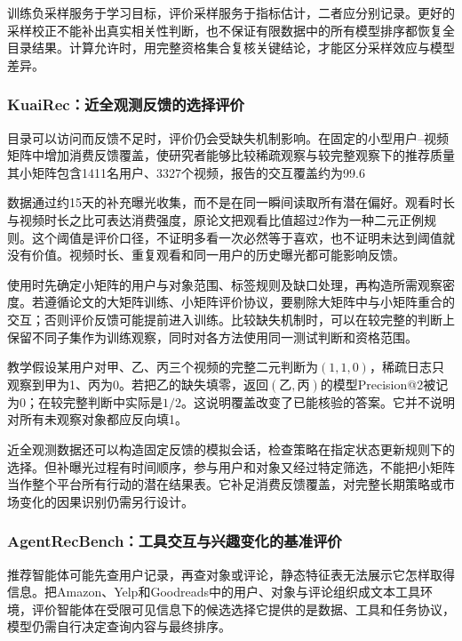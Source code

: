 训练负采样服务于学习目标，评价采样服务于指标估计，二者应分别记录。更好的采样校正不能补出真实相关性判断，也不保证有限数据中的所有模型排序都恢复全目录结果。计算允许时，用完整资格集合复核关键结论，才能区分采样效应与模型差异。

\Needspace{95mm}
\subsubsection{KuaiRec：近全观测反馈的选择评价}
\label{sec:rs-evaluation-kuairec}

目录可以访问而反馈不足时，评价仍会受缺失机制影响。在固定的小型用户--视频矩阵中增加消费反馈覆盖，使研究者能够比较稀疏观察与较完整观察下的推荐质量其小矩阵包含1411名用户、3327个视频，报告的交互覆盖约为99.6%

数据通过约15天的补充曝光收集，而不是在同一瞬间读取所有潜在偏好。观看时长与视频时长之比可表达消费强度，原论文把观看比值超过2作为一种二元正例规则。这个阈值是评价口径，不证明多看一次必然等于喜欢，也不证明未达到阈值就没有价值。视频时长、重复观看和同一用户的历史曝光都可能影响反馈。

使用时先确定小矩阵的用户与对象范围、标签规则及缺口处理，再构造所需观察密度。若遵循论文的大矩阵训练、小矩阵评价协议，要剔除大矩阵中与小矩阵重合的交互；否则评价反馈可能提前进入训练。比较缺失机制时，可以在较完整的判断上保留不同子集作为训练观察，同时对各方法使用同一测试判断和资格范围。

教学假设某用户对甲、乙、丙三个视频的完整二元判断为$(1,1,0)$，稀疏日志只观察到甲为1、丙为0。若把乙的缺失填零，返回$(\text{乙},\text{丙})$的模型Precision@2被记为0；在较完整判断中实际是$1/2$。这说明覆盖改变了已能核验的答案。它并不说明对所有未观察对象都应反向填1。

近全观测数据还可以构造固定反馈的模拟会话，检查策略在指定状态更新规则下的选择。但补曝光过程有时间顺序，参与用户和对象又经过特定筛选，不能把小矩阵当作整个平台所有行动的潜在结果表。它补足消费反馈覆盖，对完整长期策略或市场变化的因果识别仍需另行设计。

\Needspace{110mm}
\subsubsection{AgentRecBench：工具交互与兴趣变化的基准评价}
\label{sec:rs-evaluation-agentrecbench}

推荐智能体可能先查用户记录，再查对象或评论，静态特征表无法展示它怎样取得信息。把Amazon、Yelp和Goodreads中的用户、对象与评论组织成文本工具环境，评价智能体在受限可见信息下的候选选择它提供的是数据、工具和任务协议，模型仍需自行决定查询内容与最终排序。

